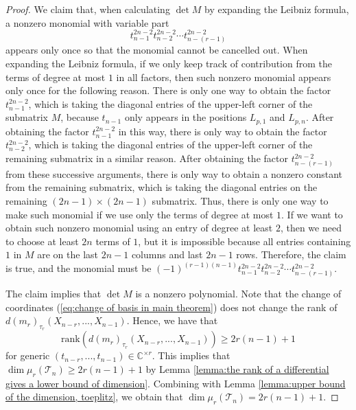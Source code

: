 \documentclass[reqno]{amsart}
\theoremstyle{definition}
\newcommand{\rank}{\mathrm{rank}}
\numberwithin{equation}{section}
\begin{document}
\begin{proof}
    We claim that, when calculating $\det M$ by expanding the Leibniz formula, a nonzero monomial with variable part
    \begin{equation*}
        t_{n-1}^{2n-2}t_{n-2}^{2n-2}\cdots t_{n-(r-1)}^{2n-2}
    \end{equation*}
    appears only once so that the monomial cannot be cancelled out. When expanding the Leibniz formula, if we only keep track of contribution from the terms of degree at most $1$ in all factors, then such nonzero monomial appears only once for the following reason. There is only one way to obtain the factor $t_{n-1}^{2n-2}$, which is taking the diagonal entries of the upper-left corner of the submatrix $M$, because $t_{n-1}$ only appears in the positions $L_{p,1}$ and $L_{p,n}$. After obtaining the factor $t_{n-1}^{2n-2}$ in this way, there is only way to obtain the factor $t_{n-2}^{2n-2}$, which is taking the diagonal entries of the upper-left corner of the remaining submatrix in a similar reason. After obtaining the factor $t_{n-(r-1)}^{2n-2}$ from these successive arguments, there is only way to obtain a nonzero constant from the remaining submatrix, which is taking the diagonal entries on the remaining $(2n-1) \times (2n-1)$ submatrix. Thus, there is only one way to make such monomial if we use only the terms of degree at most $1$. If we want to obtain such nonzero monomial using an entry of degree at least $2$, then we need to choose at least $2n$ terms of $1$, but it is impossible because all entries containing $1$ in $M$ are on the last $2n-1$ columns and last $2n-1$ rows. Therefore, the claim is true, and the monomial must be $(-1)^{(r-1)(n-1)}t_{n-1}^{2n-2}t_{n-2}^{2n-2}\cdots t_{n-(r-1)}^{2n-2}$. 

    The claim implies that $\det M$ is a nonzero polynomial. Note that the change of coordinates (\ref{eq:change of basis in main theorem}) does not change the rank of $d(m_r)_{\tau_r}(X_{n-r},...,X_{n-1})$. Hence, we have that 
    \begin{equation*}
        \rank(d(m_r)_{\tau_r}(X_{n-r},...,X_{n-1})) \geq 2r(n-1)+1
    \end{equation*}
    for generic $(t_{n-r},...,t_{n-1}) \in \mathbb{C}^{\times r}$. This implies that $\dim \mu_r(\mathcal{T}_n) \geq 2r(n-1)+1$ by Lemma \ref{lemma:the rank of a differential gives a lower bound of dimension}. Combining with Lemma \ref{lemma:upper bound of the dimension, toeplitz}, we obtain that $\dim \mu_r(\mathcal{T}_n)=2r(n-1)+1$.
\end{proof}
\end{document}
